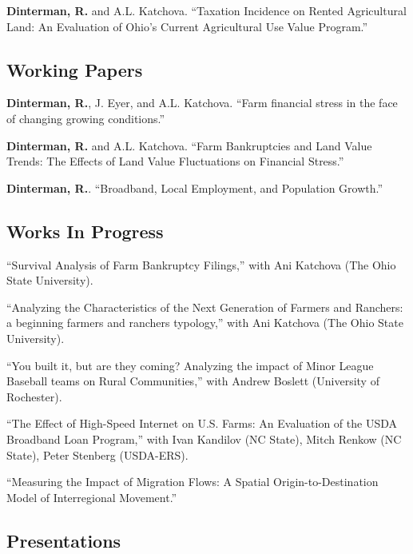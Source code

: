 \documentclass[letterpaper]{article}
\renewenvironment{itemize}{
  \begin{list}{}{
    \setlength{\leftmargin}{1.5em}
  }
}{
  \end{list}
}
\begin{document}
\begin{itemize}
\item \textbf{Dinterman, R.} and A.L. Katchova. ``Taxation Incidence on Rented Agricultural Land: An Evaluation of Ohio's Current Agricultural Use Value Program.''
\end{itemize}

\subsection*{Working Papers}

\begin{itemize}
\item \textbf{Dinterman, R.}, J. Eyer, and A.L. Katchova. ``Farm financial stress in the face of changing growing conditions.''
\item \textbf{Dinterman, R.} and A.L. Katchova. ``Farm Bankruptcies and Land Value Trends: The Effects of Land Value Fluctuations on Financial Stress.''
\item \textbf{Dinterman, R.}. ``Broadband, Local Employment, and Population Growth.''
\end{itemize}

\subsection*{Works In Progress}

\begin{itemize}
\item ``Survival Analysis of Farm Bankruptcy Filings,'' with Ani Katchova (The Ohio State University).
\item ``Analyzing the Characteristics of the Next Generation of Farmers and Ranchers: a beginning farmers and ranchers typology,'' with Ani Katchova (The Ohio State University).
\item ``You built it, but are they coming? Analyzing the impact of Minor League Baseball teams on Rural Communities,'' with Andrew Boslett (University of Rochester).
\item ``The Effect of High-Speed Internet on U.S. Farms: An Evaluation of the USDA Broadband Loan Program,'' with Ivan Kandilov (NC State), Mitch Renkow (NC State), Peter Stenberg (USDA-ERS).
\item ``Measuring the Impact of Migration Flows: A Spatial Origin-to-Destination Model of Interregional Movement.''
\end{itemize}

\subsection*{Presentations}
\end{document}
